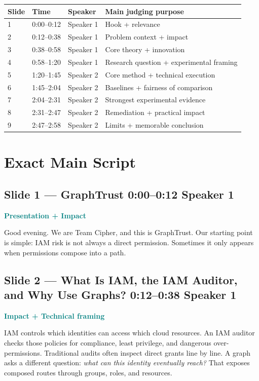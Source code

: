 \documentclass[11pt,a4paper]{article}
\newcommand{\speakerone}{\textbf{Speaker 1}}
\newcommand{\criterion}[1]{\textcolor{Teal}{\textbf{#1}}}
\newcommand{\timebox}[1]{\textcolor{Muted}{\textbf{#1}}}
\begin{document}
\begin{tabularx}{\textwidth}{p{1.0cm}p{1.55cm}p{2.0cm}X}
\toprule
\textbf{Slide} & \textbf{Time} & \textbf{Speaker} & \textbf{Main judging purpose} \\
\midrule
1 & 0:00--0:12 & Speaker 1 & Hook + relevance \\
2 & 0:12--0:38 & Speaker 1 & Problem context + impact \\
3 & 0:38--0:58 & Speaker 1 & Core theory + innovation \\
4 & 0:58--1:20 & Speaker 1 & Research question + experimental framing \\
5 & 1:20--1:45 & Speaker 2 & Core method + technical execution \\
6 & 1:45--2:04 & Speaker 2 & Baselines + fairness of comparison \\
7 & 2:04--2:31 & Speaker 2 & Strongest experimental evidence \\
8 & 2:31--2:47 & Speaker 2 & Remediation + practical impact \\
9 & 2:47--2:58 & Speaker 2 & Limits + memorable conclusion \\
\bottomrule
\end{tabularx}

\section*{Exact Main Script}

\subsection*{Slide 1 --- GraphTrust \hfill \timebox{0:00--0:12} \quad \speakerone}
\criterion{Presentation + Impact}

Good evening. We are Team Cipher, and this is GraphTrust. Our starting point is simple: IAM risk is not always a direct permission. Sometimes it only appears when permissions compose into a path.

\subsection*{Slide 2 --- What Is IAM, the IAM Auditor, and Why Use Graphs? \hfill \timebox{0:12--0:38} \quad \speakerone}
\criterion{Impact + Technical framing}

IAM controls which identities can access which cloud resources. An IAM auditor checks those policies for compliance, least privilege, and dangerous over-permissions. Traditional audits often inspect direct grants line by line. A graph asks a different question: \textit{what can this identity eventually reach?} That exposes composed routes through groups, roles, and resources.
\end{document}
